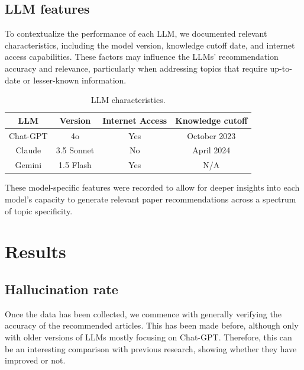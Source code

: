 \documentclass[runningheads]{llncs}
\begin{document}
\subsection{LLM features}

To contextualize the performance of each LLM, we documented relevant characteristics, including the model version, knowledge cutoff date, and internet access capabilities. These factors may influence the LLMs’ recommendation accuracy and relevance, particularly when addressing topics that require up-to-date or lesser-known information.

\begin{table}[!ht]
    \centering
    \begin{tabular}{c c c c}
        \hline
        \textbf{LLM} & \textbf{Version} & \textbf{Internet Access} & \textbf{Knowledge cutoff} \\
        \hline
        Chat-GPT & 4o & Yes & October  2023\footnotemark[1] \\
        Claude & 3.5 Sonnet & No & April 2024\footnotemark[2] \\
        Gemini & 1.5 Flash & Yes & N/A\\
        \hline
    \end{tabular}
    \caption{LLM characteristics.}
\end{table}



These model-specific features were recorded to allow for deeper insights into each model’s capacity to generate relevant paper recommendations across a spectrum of topic specificity.

\section{Results}\label{results}

\subsection{Hallucination rate}

Once the data has been collected, we commence with generally verifying the accuracy of the recommended articles. This has been made before, although only with older versions of LLMs mostly focusing on Chat-GPT. Therefore, this can be an interesting comparison with previous research, showing whether they have improved or not. 
\end{document}
